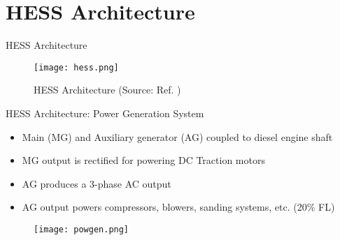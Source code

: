 \documentclass[aspectratio=169]{beamer}
\begin{document}
\section{HESS Architecture}
\begin{frame}{HESS Architecture}
		\begin{figure}
		\texttt{[image: hess.png]}
	\caption{HESS Architecture (Source: Ref. \cite{p1})}
		\label{fig:hess}
		
	\end{figure}
\end{frame}
	
	
	
	

\begin{frame}{HESS Architecture: Power Generation System}
	\begin{minipage}{0.5\textwidth}
		\begin{itemize}
			
			\item Main (MG) and Auxiliary generator (AG) coupled to diesel engine shaft

			\item MG output is rectified for powering DC Traction motors
			\item AG produces a 3-phase AC output
			\item AG output powers compressors, blowers, sanding systems, etc. (20\% FL)
		\end{itemize} 
	\end{minipage}
	\begin{minipage}{0.3\textwidth}
		\begin{figure}[h]
			\centering
			\texttt{[image: powgen.png]}
			
			
		
			\label{fig:pow1}
			
		\end{figure}
	\end{minipage}
\end{frame}
\end{document}
